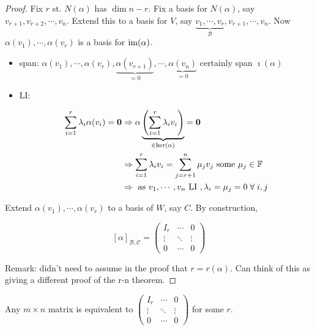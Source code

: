 \documentclass[a4paper]{article}
\begin{document}
	\begin{proof}
		Fix $ r $ st. $ N(\alpha) $ has $ \dim n - r $. Fix a basis for $ N(\alpha) $, say $ v_{r+1},v_{r+2},\cdots,v_{n} $. Extend this to a basis for $ V $, say $ \underbrace{v_{1},\cdots,v_{r}}_{\mathcal{B}},v_{r+1},\cdots,v_{n} $. Now $ \alpha(v_{1}),\cdots,\alpha(v_{r}) $ is a basis for $ \operatorname{im}(\alpha) $.
		
		\begin{itemize}
			\item span: $ \alpha(v_{1}),\cdots,\alpha(v_{r}),\underbrace{\alpha(v_{r+1})}_{=0},\cdots,\underbrace{\alpha(v_{n})}_{=0} $ certainly span $ \imath(\alpha) $
			
			\item LI: 
			
		\begin{align*}
			\sum_{i=1}^{r} \lambda_{i} \alpha(v_{i}) = \mathbf{0} & \Rightarrow \alpha \underbrace{\left(  \sum_{i=1}^{r} \lambda_{i} v_{i} \right)}_{\in \ker(\alpha)} = \mathbf{0}   \\
		& \Rightarrow \sum_{i=1}^{r} \lambda_{i}v_{i} = \sum_{j=r+1}^{n} \mu_{j} v_{j} \text{ some } \mu_{j} \in \mathbb{F} \\
		& \Rightarrow \text{ as } v_{1},\cdots,v_{n} \text{ LI }, \lambda_{i} = \mu_{j} = 0 \; \forall \; i,j 
		\end{align*}
		\end{itemize}
	
	Extend $ \alpha(v_{1}),\cdots,\alpha(v_{r}) $ to a basis of $ W $, say $ C $. By construction, 
	
		\[ [\alpha]_{\mathcal{B},\mathcal{C}}  = \begin{pmatrix}
	I_{r} & \cdots & 0 \\
	\vdots & \ddots & \vdots \\
	0 & \cdots & 0  
	\end{pmatrix}\]
	
	Remark: didn't need to assume in the proof that $ r = r(\alpha) $. Can think of this as giving a different proof of the r-n theorem.
	
		
		
		 	

\end{proof}

\begin{cor} 
	Any $ m \times n $ matrix is equivalent to $ \begin{pmatrix}
	I_{r} & \cdots & 0 \\
	\vdots & \ddots & \vdots \\
	0 & \cdots & 0  
	\end{pmatrix} $ for some $ r $.
\end{cor}
\end{document}
